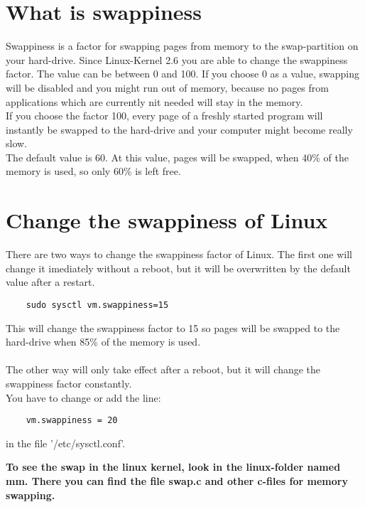 \documentclass[a4paper, oneside]{scrreprt}
\author{Andre Brand}
\begin{document}
\chapter{What is swappiness}

Swappiness is a factor for swapping pages from memory to the swap-partition on your hard-drive. Since Linux-Kernel 2.6 you are able to change the swappiness factor. The value can be between 0 and 100. If you choose 0 as a value, swapping will be disabled and you might run out of memory, because no pages from applications which are currently nit needed will stay in the memory.\\
If you choose the factor 100, every page of a freshly started program will instantly be swapped to the hard-drive and your computer might become really slow.\\
The default value is 60. At this value, pages will be swapped, when 40\% of the memory is used, so only 60\% is left free.

\chapter{Change the swappiness of Linux}

There are two ways to change the swappiness factor of Linux. The first one will change it imediately without a reboot, but it will be overwritten by the default value after a restart.
\begin{verbatim}
    sudo sysctl vm.swappiness=15
\end{verbatim}
This will change the swappiness factor to 15 so pages will be swapped to the hard-drive when 85\% of the memory is used.\\
\\
The other way will only take effect after a reboot, but it will change the swappiness factor constantly.\\
You have to change or add the line:
\begin{verbatim}
    vm.swappiness = 20
\end{verbatim}
in the file '/etc/sysctl.conf'.

\textbf{To see the swap in the linux kernel, look in the linux-folder named mm. There you can find the file swap.c and other c-files for memory swapping.}
\end{document}
